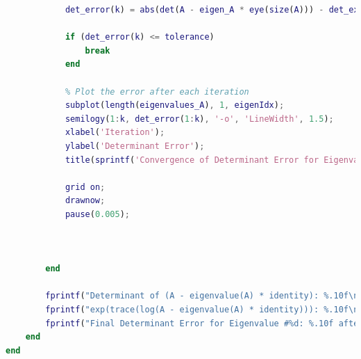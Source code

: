 \begin{sourcecode}
\begin{lstlisting}[language=MATLAB, caption=finding determinant equation using eigen value]
            % Calculate the error
            det_error(k) = abs(det(A - eigen_A * eye(size(A))) - det_exp_trace_log_A_series(k));
            
            if (det_error(k) <= tolerance)
                break
            end

            % Plot the error after each iteration
            subplot(length(eigenvalues_A), 1, eigenIdx);
            semilogy(1:k, det_error(1:k), '-o', 'LineWidth', 1.5);
            xlabel('Iteration');
            ylabel('Determinant Error');
            title(sprintf('Convergence of Determinant Error for Eigenvalue #%d', eigenIdx));

            grid on;
            drawnow;
            pause(0.005);

            
            
        end
        
        fprintf("Determinant of (A - eigenvalue(A) * identity): %.10f\n", det(A - eigen_A * eye(size(A))));
        fprintf("exp(trace(log(A - eigenvalue(A) * identity))): %.10f\n", det(exp(trace(log_A_series - eigen_A * eye(size(A))))));
        fprintf("Final Determinant Error for Eigenvalue #%d: %.10f after %d iteration \n", eigenIdx, det_error(end),k);
    end
end

    \end{lstlisting}
\end{sourcecode}



